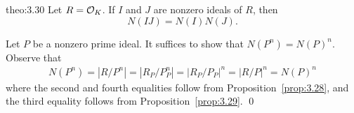 \begin{theo}{theo:3.30}
    Let $R = {\cal O}_K$. If $I$ and $J$ are nonzero ideals of $R$, then 
    \[ N(IJ) = N(I) N(J). \] 
\end{theo}\vspace{-0.25cm}
\begin{pf}
    Let $P$ be a nonzero prime ideal. It suffices to show that $N(P^n) = N(P)^n$.
    Observe that 
    \begin{align*}
        N(P^n) = |R/P^n| 
        = |R_P/P_P^n|  
        = |R_P/P_P|^n 
        = |R/P|^n  
        = N(P)^n
    \end{align*}
    where the second and fourth equalities follow from Proposition~\ref{prop:3.28},
    and the third equality follows from Proposition~\ref{prop:3.29}. \qed 
\end{pf}\vspace{-0.25cm}